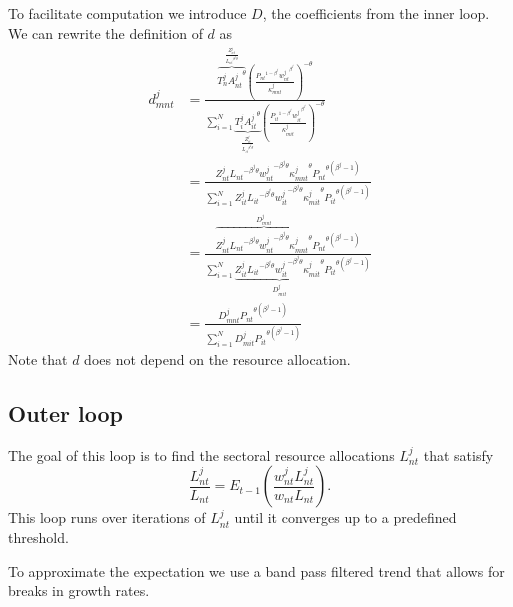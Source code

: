 \documentclass[11pt,oneside,a4paper]{article}
\begin{document}
To facilitate computation we introduce $D$, the coefficients from the inner loop.
We can rewrite the definition of $d$ as
\begin{align*}
  d_{mnt}^j &= \frac{\overbrace{T_n^j {A_{nt}^j}^{\theta}}^{\frac{Z_{nt}^j}{{L_{nt}}^{\beta^j\theta}}} \left(\frac{{P_{nt}}^{1 - \beta^j} {w_{nt}^j}^{\beta^j}}{\kappa_{mnt}^j}\right)^{-\theta}}{\sum_{i = 1}^N \underbrace{T_i^j {A_{it}^j}^{\theta}}_{\frac{Z_{it}^j}{{L_{it}}^{\beta^j\theta}}} \left(\frac{{P_{it}}^{1 - \beta^j} {w_{it}^j}^{\beta^j}}{\kappa_{mit}^j}\right)^{-\theta}}\\
%
  &= \frac{Z_{nt}^j {L_{nt}}^{- \beta^j\theta} {w_{nt}^j}^{-\beta^j\theta} {\kappa_{mnt}^j}^{\theta}{P_{nt}}^{\theta(\beta^j - 1)}}{\sum_{i = 1}^N Z_{it}^j {L_{it}}^{- \beta^j\theta} {w_{it}^j}^{-\beta^j\theta} {\kappa_{mit}^j}^{\theta}{P_{it}}^{\theta(\beta^j - 1)}}\\
%
  &= \frac{\overbrace{Z_{nt}^j {L_{nt}}^{- \beta^j\theta} {w_{nt}^j}^{-\beta^j\theta} {\kappa_{mnt}^j}^{\theta}}^{D_{mnt}^j}{P_{nt}}^{\theta(\beta^j - 1)}}{\sum_{i = 1}^N \underbrace{Z_{it}^j {L_{it}}^{- \beta^j\theta} {w_{it}^j}^{-\beta^j\theta} {\kappa_{mit}^j}^{\theta}}_{D_{mit}^j}{P_{it}}^{\theta(\beta^j - 1)}}\\
%
  &= \frac{D_{mnt}^j {P_{nt}}^{\theta(\beta^j - 1)}}{\sum_{i = 1}^N D_{mit}^j{P_{it}}^{\theta(\beta^j - 1)}}
\end{align*}
Note that $d$ does not depend on the resource allocation.



\newpage
\subsection{Outer loop}
The goal of this loop is to find the sectoral resource allocations $L_{nt}^j$ that satisfy
$$\frac{L_{nt}^{j}}{L_{nt}} = E_{t - 1} \left( \frac{w_{nt}^j L_{nt}^j}{w_{nt} L_{nt}}\right).$$
This loop runs over iterations of $L_{nt}^j$ until it converges up to a predefined threshold.

To approximate the expectation we use a band pass filtered trend that allows for breaks in growth rates.
\end{document}
